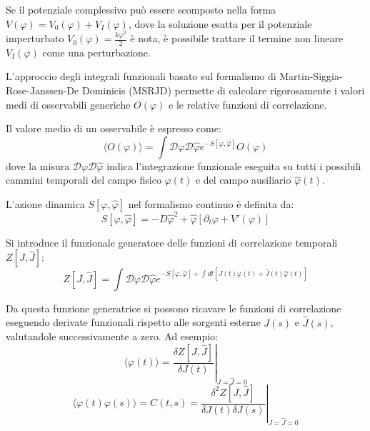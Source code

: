Se il potenziale complessivo può essere scomposto nella forma $V(\varphi) = V_0(\varphi) + V_I(\varphi)$, dove la soluzione esatta per il potenziale imperturbato $V_0(\varphi) = \frac{k\varphi^2}{2}$ è nota, è possibile trattare il termine non lineare $V_I(\varphi)$ come una perturbazione.

L'approccio degli integrali funzionali basato sul formalismo di Martin-Siggia-Rose-Janssen-De Dominicis (MSRJD) permette di calcolare rigorosamente i valori medi di osservabili generiche $O(\varphi)$ e le relative funzioni di correlazione.

\noindent Il valore medio di un osservabile è espresso come:
\begin{equation}
\langle O(\varphi) \rangle = \int \mathcal{D}\varphi \mathcal{D}\hat{\varphi} e^{-S[\varphi,\hat{\varphi}]} O(\varphi)
\end{equation}
dove la misura $\mathcal{D}\varphi \mathcal{D}\hat{\varphi}$ indica l'integrazione funzionale eseguita su tutti i possibili cammini temporali del campo fisico $\varphi(t)$ e del campo ausiliario $\hat{\varphi}(t)$.

L'azione dinamica $S[\varphi,\hat{\varphi}]$ nel formalismo continuo è definita da:
\begin{equation}
S[\varphi,\hat{\varphi}] = -D\hat{\varphi}^2 + \hat{\varphi} \left[ \partial_t\varphi + V'(\varphi) \right]
\label{eq:msrjd_azione_continua}
\end{equation}

Si introduce il funzionale generatore delle funzioni di correlazione temporali $Z[J,\hat{J}]$:
\begin{equation}
Z[J,\hat{J}] = \int \mathcal{D}\varphi \mathcal{D}\hat{\varphi} e^{-S[\varphi,\hat{\varphi}] + \int dt \left[J(t)\varphi(t) + \hat{J}(t)\hat{\varphi}(t)\right]}
\label{eq:funzionale_generatore_completo}
\end{equation}

Da questa funzione generatrice si possono ricavare le funzioni di correlazione eseguendo derivate funzionali rispetto alle sorgenti esterne $J(s)$ e $\hat{J}(s)$, valutandole successivamente a zero. Ad esempio:
\begin{equation}
\langle \varphi(t) \rangle = \left. \frac{\delta Z[J,\hat{J}]}{\delta J(t)} \right|_{J=\hat{J}=0}
\end{equation}
\begin{equation}
\langle \varphi(t)\varphi(s) \rangle = C(t,s) = \left. \frac{\delta^2 Z[J,\hat{J}]}{\delta J(t)\delta J(s)} \right|_{J=\hat{J}=0}
\end{equation}

